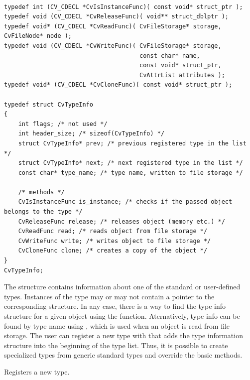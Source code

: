 \begin{lstlisting}

typedef int (CV_CDECL *CvIsInstanceFunc)( const void* struct_ptr );
typedef void (CV_CDECL *CvReleaseFunc)( void** struct_dblptr );
typedef void* (CV_CDECL *CvReadFunc)( CvFileStorage* storage, CvFileNode* node );
typedef void (CV_CDECL *CvWriteFunc)( CvFileStorage* storage,
                                      const char* name,
                                      const void* struct_ptr,
                                      CvAttrList attributes );
typedef void* (CV_CDECL *CvCloneFunc)( const void* struct_ptr );

typedef struct CvTypeInfo
{
    int flags; /* not used */
    int header_size; /* sizeof(CvTypeInfo) */
    struct CvTypeInfo* prev; /* previous registered type in the list */
    struct CvTypeInfo* next; /* next registered type in the list */
    const char* type_name; /* type name, written to file storage */

    /* methods */
    CvIsInstanceFunc is_instance; /* checks if the passed object belongs to the type */
    CvReleaseFunc release; /* releases object (memory etc.) */
    CvReadFunc read; /* reads object from file storage */
    CvWriteFunc write; /* writes object to file storage */
    CvCloneFunc clone; /* creates a copy of the object */
}
CvTypeInfo;

\end{lstlisting}

The structure  contains information about one of the
standard or user-defined types. Instances of the type may or may not
contain a pointer to the corresponding  structure. In
any case, there is a way to find the type info structure for a given object
using the  function. Aternatively, type info can be found by
type name using , which is used when an object is read
from file storage. The user can register a new type with 
that adds the type information structure into the beginning of the type
list. Thus, it is possible to create specialized types from generic
standard types and override the basic methods.

\label{RegisterType}

Registers a new type.


\begin{description}
\end{description}

